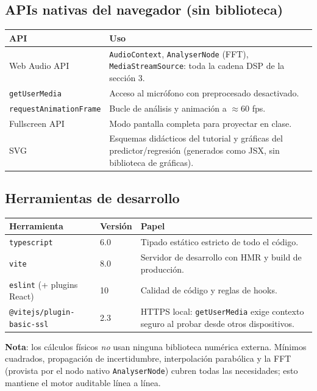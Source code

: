 \documentclass[11pt,a4paper]{article}
\begin{document}
\subsection{APIs nativas del navegador (sin biblioteca)}

\begin{center}
\begin{tabular}{@{}lp{9.6cm}@{}}
\toprule
API & Uso \\
\midrule
Web Audio API & \texttt{AudioContext}, \texttt{AnalyserNode} (FFT),
\texttt{MediaStreamSource}: toda la cadena DSP de la sección 3. \\
\texttt{getUserMedia} & Acceso al micrófono con preprocesado desactivado. \\
\texttt{requestAnimationFrame} & Bucle de análisis y animación a $\approx 60$ fps. \\
Fullscreen API & Modo pantalla completa para proyectar en clase. \\
SVG & Esquemas didácticos del tutorial y gráficas del predictor/regresión
(generados como JSX, sin biblioteca de gráficas). \\
\bottomrule
\end{tabular}
\end{center}

\subsection{Herramientas de desarrollo}

\begin{center}
\begin{tabular}{@{}llp{7.2cm}@{}}
\toprule
Herramienta & Versión & Papel \\
\midrule
\texttt{typescript} & 6.0 & Tipado estático estricto de todo el código. \\
\texttt{vite} & 8.0 & Servidor de desarrollo con HMR y build de producción. \\
\texttt{eslint} (+ plugins React) & 10 & Calidad de código y reglas de hooks. \\
\texttt{@vitejs/plugin-basic-ssl} & 2.3 & HTTPS local: \texttt{getUserMedia} exige contexto
seguro al probar desde otros dispositivos. \\
\bottomrule
\end{tabular}
\end{center}

\textbf{Nota}: los cálculos físicos \emph{no} usan ninguna biblioteca numérica externa.
Mínimos cuadrados, propagación de incertidumbre, interpolación parabólica y la FFT (provista
por el nodo nativo \texttt{AnalyserNode}) cubren todas las necesidades; esto mantiene el
motor auditable línea a línea.
\end{document}
